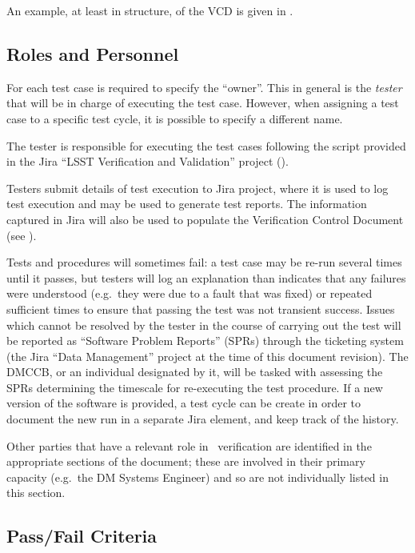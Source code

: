 An example, at least in structure, of the VCD is given in .



\subsection{Roles and Personnel}
\label{sect:roles}


For each test case is required to specify the ``owner''.
This in general is the \emph{tester} that will be in charge of executing the test case.
However, when assigning a test case to a specific test cycle, it is possible to specify a different name.

The tester is responsible for executing the test cases following the script provided in the Jira ``LSST Verification and Validation'' project ().

Testers submit details of test execution to Jira project, where it is used to log test execution and may be used to generate test reports.
The information captured in Jira will also be used to populate the Verification Control Document (see ).

Tests and procedures will sometimes fail: a test case may be re-run several times until it passes, but testers will log an explanation than indicates that any failures were understood (e.g.\ they were due to a fault that was fixed) or repeated sufficient times to ensure that passing the test was not transient success.
Issues which cannot be resolved by the tester in the course of carrying out the test will be reported as ``Software Problem Reports'' (SPRs) through the \product{} ticketing system (the Jira ``Data Management'' project at the time of this document revision).
The DMCCB, or an individual designated by it, will be tasked with assessing the SPRs determining the timescale for re-executing the test procedure.
If a new version of the software is provided, a test cycle can be create in order to document the new run in a separate Jira element, and keep track of the history.

Other parties that have a relevant role in \product\ verification are identified in the appropriate sections of the document; these are involved in their primary capacity (e.g.\ the DM Systems Engineer) and so are not individually listed in this section.

\subsection{Pass/Fail Criteria}

